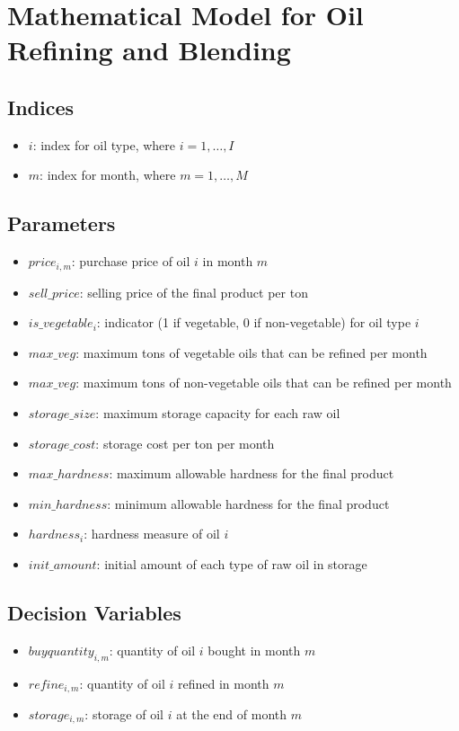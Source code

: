 \documentclass{article}
\begin{document}
\section*{Mathematical Model for Oil Refining and Blending}

\subsection*{Indices}
\begin{itemize}
    \item $i$: index for oil type, where $i = 1, \ldots, I$
    \item $m$: index for month, where $m = 1, \ldots, M$
\end{itemize}

\subsection*{Parameters}
\begin{itemize}
    \item $price_{i,m}$: purchase price of oil $i$ in month $m$
    \item $sell\_price$: selling price of the final product per ton
    \item $is\_vegetable_{i}$: indicator (1 if vegetable, 0 if non-vegetable) for oil type $i$
    \item $max\_veg$: maximum tons of vegetable oils that can be refined per month
    \item $max\_veg$: maximum tons of non-vegetable oils that can be refined per month
    \item $storage\_size$: maximum storage capacity for each raw oil
    \item $storage\_cost$: storage cost per ton per month
    \item $max\_hardness$: maximum allowable hardness for the final product
    \item $min\_hardness$: minimum allowable hardness for the final product
    \item $hardness_{i}$: hardness measure of oil $i$
    \item $init\_amount$: initial amount of each type of raw oil in storage
\end{itemize}

\subsection*{Decision Variables}
\begin{itemize}
    \item $buyquantity_{i,m}$: quantity of oil $i$ bought in month $m$
    \item $refine_{i,m}$: quantity of oil $i$ refined in month $m$
    \item $storage_{i,m}$: storage of oil $i$ at the end of month $m$
\end{itemize}
\end{document}
